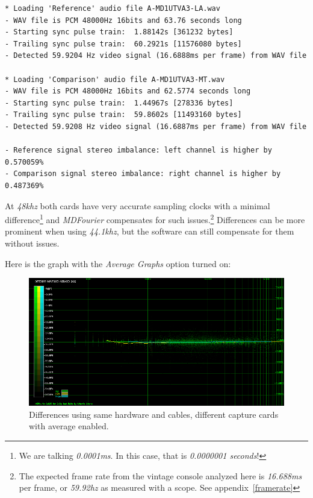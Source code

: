 \documentclass[10pt,a4paper]{report}
\newcommand{\ac}[1]{\textit{\mbox{\acrshort{#1}}}}
\newcommand{\hz}[1]{\textit{\mbox{#1\acrshort{hz}}}}
\newcommand{\khz}[1]{\textit{\mbox{#1\acrshort{khz}}}}
\begin{document}
\begin{verbatim}
* Loading 'Reference' audio file A-MD1UTVA3-LA.wav
- WAV file is PCM 48000Hz 16bits and 63.76 seconds long
- Starting sync pulse train:  1.88142s [361232 bytes]
- Trailing sync pulse train:  60.2921s [11576080 bytes]
- Detected 59.9204 Hz video signal (16.6888ms per frame) from WAV file

* Loading 'Comparison' audio file A-MD1UTVA3-MT.wav
- WAV file is PCM 48000Hz 16bits and 62.5774 seconds long
- Starting sync pulse train:  1.44967s [278336 bytes]
- Trailing sync pulse train:  59.8602s [11493160 bytes]
- Detected 59.9208 Hz video signal (16.6887ms per frame) from WAV file

- Reference signal stereo imbalance: left channel is higher by 0.570059%
- Comparison signal stereo imbalance: right channel is higher by 0.487369%
\end{verbatim}

At \khz{48} both cards have very accurate sampling clocks with a minimal difference\footnote{We are talking \textit{0.0001}\ac{ms}. In this case, that is \textit{0.0000001 seconds}!} and \textit{MDFourier} compensates for such issues.\footnote{The expected frame rate from the vintage console analyzed here is \textit{16.688}\ac{ms} per frame, or \hz{59.92} as measured with a scope. See appendix~\ref{framerate}} Differences can be more prominent when using \khz{44.1}, but the software can still compensate for them without issues.

Here is the graph with the \textit{Average Graphs} option turned on:

\begin{figure}[H]
	\centering
	\includegraphics[width=1.0\linewidth]{images/interpretation/Plot5-2-avg.png}
	\caption[Different sound cards AVG]{Differences using same hardware and cables, different capture cards with average enabled.}
	\label{fig:plot5-2-avg}
\end{figure}
\end{document}
